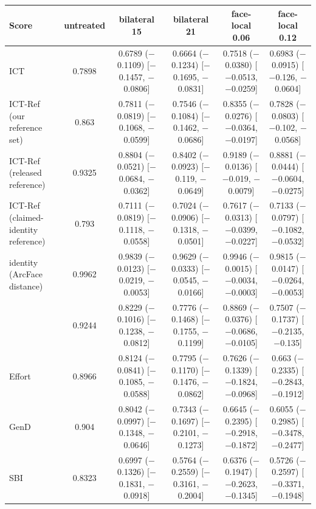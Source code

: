 \begin{tabular}{@{}l ccccc@{}}
\toprule
Score & untreated & bilateral 15 & bilateral 21 & face-local 0.06 & face-local 0.12 \\
\midrule
ICT & 0.7898 & 0.6789 ($-$0.1109) [$-$0.1457, $-$0.0806] & 0.6664 ($-$0.1234) [$-$0.1695, $-$0.0831] & 0.7518 ($-$0.0380) [$-$0.0513, $-$0.0259] & 0.6983 ($-$0.0915) [$-$0.126, $-$0.0604] \\
ICT-Ref (our reference set) & 0.863 & 0.7811 ($-$0.0819) [$-$0.1068, $-$0.0599] & 0.7546 ($-$0.1084) [$-$0.1462, $-$0.0686] & 0.8355 ($-$0.0276) [$-$0.0364, $-$0.0197] & 0.7828 ($-$0.0803) [$-$0.102, $-$0.0568] \\
ICT-Ref (released reference) & 0.9325 & 0.8804 ($-$0.0521) [$-$0.0684, $-$0.0362] & 0.8402 ($-$0.0923) [$-$0.119, $-$0.0649] & 0.9189 ($-$0.0136) [$-$0.019, $-$0.0079] & 0.8881 ($-$0.0444) [$-$0.0604, $-$0.0275] \\
ICT-Ref (claimed-identity reference) & 0.793 & 0.7111 ($-$0.0819) [$-$0.1118, $-$0.0558] & 0.7024 ($-$0.0906) [$-$0.1318, $-$0.0501] & 0.7617 ($-$0.0313) [$-$0.0399, $-$0.0227] & 0.7133 ($-$0.0797) [$-$0.1082, $-$0.0532] \\
identity (ArcFace distance) & 0.9962 & 0.9839 ($-$0.0123) [$-$0.0219, $-$0.0053] & 0.9629 ($-$0.0333) [$-$0.0545, $-$0.0166] & 0.9946 ($-$0.0015) [$-$0.0034, $-$0.0003] & 0.9815 ($-$0.0147) [$-$0.0264, $-$0.0053] \\
\oursB{} & 0.9244 & 0.8229 ($-$0.1016) [$-$0.1238, $-$0.0812] & 0.7776 ($-$0.1468) [$-$0.1755, $-$0.1199] & 0.8869 ($-$0.0376) [$-$0.0686, $-$0.0105] & 0.7507 ($-$0.1737) [$-$0.2135, $-$0.135] \\
Effort & 0.8966 & 0.8124 ($-$0.0841) [$-$0.1085, $-$0.0588] & 0.7795 ($-$0.1170) [$-$0.1476, $-$0.0862] & 0.7626 ($-$0.1339) [$-$0.1824, $-$0.0968] & 0.663 ($-$0.2335) [$-$0.2843, $-$0.1912] \\
GenD & 0.904 & 0.8042 ($-$0.0997) [$-$0.1348, $-$0.0646] & 0.7343 ($-$0.1697) [$-$0.2101, $-$0.1273] & 0.6645 ($-$0.2395) [$-$0.2918, $-$0.1872] & 0.6055 ($-$0.2985) [$-$0.3478, $-$0.2477] \\
SBI & 0.8323 & 0.6997 ($-$0.1326) [$-$0.1831, $-$0.0918] & 0.5764 ($-$0.2559) [$-$0.3161, $-$0.2004] & 0.6376 ($-$0.1947) [$-$0.2623, $-$0.1345] & 0.5726 ($-$0.2597) [$-$0.3371, $-$0.1948] \\
\bottomrule
\end{tabular}
